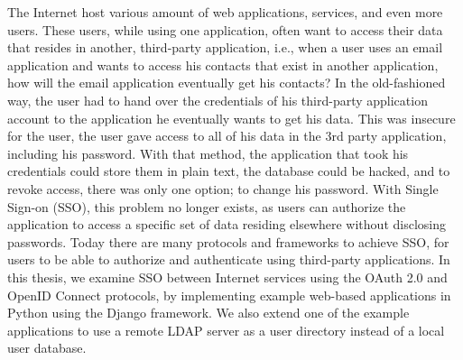 
The Internet host various amount of web applications, services, and even more users.
These users, while using one application, often want to access their data that resides in another, third-party application, i.e., when a user uses an email application and wants to access his contacts that exist in another application, how will the email application eventually get his contacts?
In the old-fashioned way, the user had to hand over the credentials of his third-party application account to the application he eventually wants to get his data.
This was insecure for the user, the user gave access to all of his data in the 3rd party application, including his password.
With that method, the application that took his credentials could store them in plain text, the database could be hacked, and to revoke access, there was only one option; to change his password. With Single Sign-on (SSO), this problem no longer exists, as users can authorize the application to access a specific set of data residing elsewhere without disclosing passwords.
Today there are many protocols and frameworks to achieve SSO, for users to be able to authorize and authenticate using third-party applications.
In this thesis, we examine SSO between Internet services using the OAuth 2.0 and OpenID Connect protocols, by implementing example web-based applications in Python using the Django framework. We also extend one of the example applications to use a remote LDAP server as a user directory instead of a local user database.
